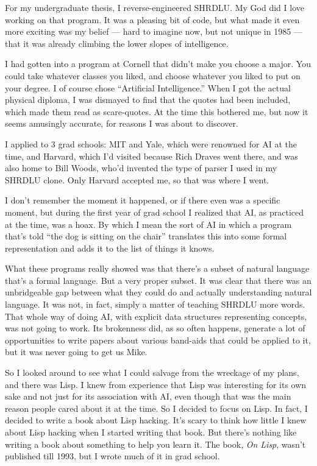 For my undergraduate thesis, I reverse-engineered SHRDLU. My God did I
love working on that program. It was a pleasing bit of code, but what
made it even more exciting was my belief --- hard to imagine now, but
not unique in 1985 --- that it was already climbing the lower slopes of
intelligence.

I had gotten into a program at Cornell that didn't make you choose a
major. You could take whatever classes you liked, and choose whatever
you liked to put on your degree. I of course chose ``Artificial
Intelligence.'' When I got the actual physical diploma, I was dismayed
to find that the quotes had been included, which made them read as
scare-quotes. At the time this bothered me, but now it seems amusingly
accurate, for reasons I was about to discover.

I applied to 3 grad schools: MIT and Yale, which were renowned for AI at
the time, and Harvard, which I'd visited because Rich Draves went there,
and was also home to Bill Woods, who'd invented the type of parser I
used in my SHRDLU clone. Only Harvard accepted me, so that was where I
went.

I don't remember the moment it happened, or if there even was a specific
moment, but during the first year of grad school I realized that AI, as
practiced at the time, was a hoax. By which I mean the sort of AI in
which a program that's told ``the dog is sitting on the chair''
translates this into some formal representation and adds it to the list
of things it knows.

What these programs really showed was that there's a subset of natural
language that's a formal language. But a very proper subset. It was
clear that there was an unbridgeable gap between what they could do and
actually understanding natural language. It was not, in fact, simply a
matter of teaching SHRDLU more words. That whole way of doing AI, with
explicit data structures representing concepts, was not going to work.
Its brokenness did, as so often happens, generate a lot of opportunities
to write papers about various band-aids that could be applied to it, but
it was never going to get us Mike.

So I looked around to see what I could salvage from the wreckage of my
plans, and there was Lisp. I knew from experience that Lisp was
interesting for its own sake and not just for its association with AI,
even though that was the main reason people cared about it at the time.
So I decided to focus on Lisp. In fact, I decided to write a book about
Lisp hacking. It's scary to think how little I knew about Lisp hacking
when I started writing that book. But there's nothing like writing a
book about something to help you learn it. The book, \emph{On Lisp},
wasn't published till 1993, but I wrote much of it in grad school.

